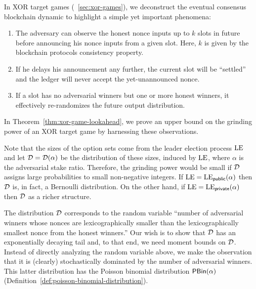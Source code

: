     In XOR target games (\Section~\ref{sec:xor-games}), 
    we deconstruct the eventual consensus blockchain dynamic 
    to highlight a simple yet important phenomena: 
    \begin{enumerate}
        \item The adversary can observe the honest nonce inputs up to $k$ slots in future 
        before announcing his nonce inputs from a given slot.
        Here, $k$ is given by the blockchain protocols consistency property.

        \item If he delays his announcement any further, the current slot will be ``settled'' 
        and the ledger will never accept the yet-unannounced nonce.

        \item If a slot has no adversarial winners but one or more honest winners, 
        it effectively re-randomizes the future output distribution.
    \end{enumerate}
    In Theorem~\ref{thm:xor-game-lookahead}, 
    we prove an upper bound on the grinding power of an XOR target game 
    by harnessing these observations. 

    Note that the sizes of the option sets come from 
    the leader election process $\mathrm{LE}$
    and let $\mathcal{D} = \mathcal{D}(\alpha)$ be the distribution 
    of these sizes, induced by $\mathrm{LE}$, 
    where $\alpha$ is the adversarial stake ratio.
    Therefore, the grinding power would be small if 
    $\mathcal{D}$ assigns large probabilities to small non-negative integers.
    If $\mathrm{LE} = \mathrm{LE}_\mathsf{public}(\alpha)$ then $\mathcal{D}$ is, in fact, 
    a Bernoulli distribution. 
    On the other hand, if $\mathrm{LE} = \mathrm{LE}_\mathsf{private}(\alpha)$ then 
    $\mathcal{D}$ as a richer structure.

    The distribution $\mathcal{D}$ corresponds to the random variable 
    ``number of adversarial winners whose nonces are lexicographically smaller 
    than the lexicographically smallest nonce from the honest winners.'' 
    Our wish is to show that 
    $\mathcal{D}$ has an exponentially decaying tail 
    and, to that end, 
    we need moment bounds on $\mathcal{D}$. 
    Instead of directly analyzing the random variable above, 
    we make the observation that it is (clearly) 
    stochastically dominated by 
    the number of adversarial winners.
    This latter distribution has the Poisson binomial distribution 
    $\mathsf{PBin}(\alpha)$ 
    (Definition~\ref{def:poisson-binomial-distribution}).
    
